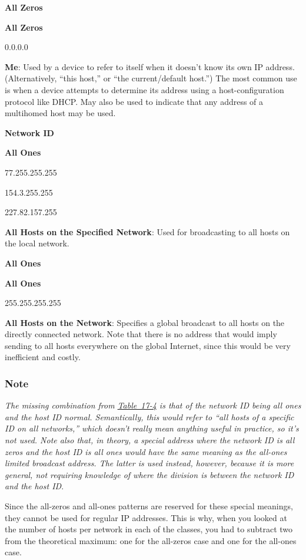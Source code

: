 {\textbf{All Zeros}}

{\textbf{All Zeros}}

0.0.0.0

{\textbf{Me}}: Used by a device to refer to itself when it doesn't know
its own IP address. (Alternatively, ``this host,'' or ``the current/default
host.'') The most common use is when a device attempts to determine its
address using a host-configuration protocol like DHCP. May also be used
to indicate that any address of a multihomed host may be used.

{\textbf{Network ID}}

{\textbf{All Ones}}

77.255.255.255

154.3.255.255

227.82.157.255

{\textbf{All Hosts on the Specified Network}}: Used for broadcasting to
all hosts on the local network.

{\textbf{All Ones}}

{\textbf{All Ones}}

255.255.255.255

{\textbf{All Hosts on the Network}}: Specifies a global broadcast to all
hosts on the directly connected network. Note that there is no address
that would imply sending to all hosts everywhere on the global Internet,
since this would be very inefficient and costly.

\subsubsection[Note]{\texorpdfstring{\protect\hypertarget{ch17s04.htmlux5cux23note-66}{}{}Note}{Note}}

{\emph{The missing combination from
\protect\hyperlink{ch17s04.htmlux5cux23ip_address_patterns_with_special_meaning}{Table~17-4}
is that of the network ID being all ones and the host ID normal.
Semantically, this would refer to ``all hosts of a specific ID on all
networks,'' which doesn't really mean anything useful in practice, so
it's not used. Note also that, in theory, a special address where the
network ID is all zeros and the host ID is all ones would have the same
meaning as the all-ones limited broadcast address. The latter is used
instead, however, because it is more general, not requiring knowledge of
where the division is between the network ID and the host ID}}.

Since the all-zeros and all-ones patterns are reserved for these special
meanings, they cannot be used for regular
\protect\hypertarget{ch17s04.htmlux5cux23idx-CHP-17-0697}{}{}IP
addresses. This is why, when you looked at the number of hosts per
network in each of the classes, you had to subtract two from the
theoretical maximum: one for the all-zeros case and one for the all-ones
case.\protect\hypertarget{ch17s04.htmlux5cux23idx-CHP-17-0698}{}{}

